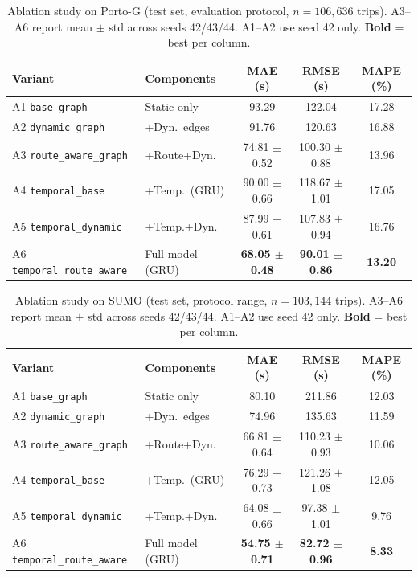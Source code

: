 \documentclass[pdflatex,sn-basic,Numbered]{sn-jnl}%
\begin{document}
\begin{table}[t]
    \centering
    \caption{Ablation study on Porto-G (test set, evaluation protocol, $n{=}106{,}636$ trips). A3--A6 report mean $\pm$ std across seeds 42/43/44. A1--A2 use seed 42 only. \textbf{Bold} = best per column.}
    \label{tab:ablation_porto}
    {\footnotesize\setlength{\tabcolsep}{4pt}%
    \begin{tabular}{@{}llccc@{}}
        \toprule
        \textbf{Variant} & \textbf{Components} & \textbf{MAE (s)} & \textbf{RMSE (s)} & \textbf{MAPE (\%)} \\
        \midrule
        A1 \texttt{base\_graph}            & Static only         & 93.29 & 122.04 & 17.28 \\
        A2 \texttt{dynamic\_graph}         & +Dyn.\ edges        & 91.76 & 120.63 & 16.88 \\
        A3 \texttt{route\_aware\_graph}    & +Route+Dyn.\        & 74.81 $\pm$ 0.52 & 100.30 $\pm$ 0.88 & 13.96 \\
        A4 \texttt{temporal\_base}         & +Temp.\ (GRU)       & 90.00 $\pm$ 0.66 & 118.67 $\pm$ 1.01 & 17.05 \\
        A5 \texttt{temporal\_dynamic}      & +Temp.+Dyn.\        & 87.99 $\pm$ 0.61 & 107.83 $\pm$ 0.94 & 16.76 \\
        A6 \texttt{temporal\_route\_aware} & Full model (GRU)    & \textbf{68.05 $\pm$ 0.48} & \textbf{90.01 $\pm$ 0.86} & \textbf{13.20} \\
        \bottomrule
    \end{tabular}}%
\end{table}

\begin{table}[t]
    \centering
    \caption{Ablation study on SUMO (test set, protocol range, $n{=}103{,}144$ trips). A3--A6 report mean $\pm$ std across seeds 42/43/44. A1--A2 use seed 42 only. \textbf{Bold} = best per column.}
    \label{tab:ablation_sumo}
    {\footnotesize\setlength{\tabcolsep}{4pt}%
    \begin{tabular}{@{}llccc@{}}
        \toprule
        \textbf{Variant} & \textbf{Components} & \textbf{MAE (s)} & \textbf{RMSE (s)} & \textbf{MAPE (\%)} \\
        \midrule
        A1 \texttt{base\_graph}            & Static only         & 80.10 & 211.86 & 12.03 \\
        A2 \texttt{dynamic\_graph}         & +Dyn.\ edges        & 74.96 & 135.63 & 11.59 \\
        A3 \texttt{route\_aware\_graph}    & +Route+Dyn.\        & 66.81 $\pm$ 0.64 & 110.23 $\pm$ 0.93 & 10.06 \\
        A4 \texttt{temporal\_base}         & +Temp.\ (GRU)       & 76.29 $\pm$ 0.73 & 121.26 $\pm$ 1.08 & 12.05 \\
        A5 \texttt{temporal\_dynamic}      & +Temp.+Dyn.\        & 64.08 $\pm$ 0.66 & 97.38 $\pm$ 1.01 & 9.76 \\
        A6 \texttt{temporal\_route\_aware} & Full model (GRU)    & \textbf{54.75 $\pm$ 0.71} & \textbf{82.72 $\pm$ 0.96} & \textbf{8.33} \\
        \bottomrule
    \end{tabular}}%
\end{table}
\end{document}
